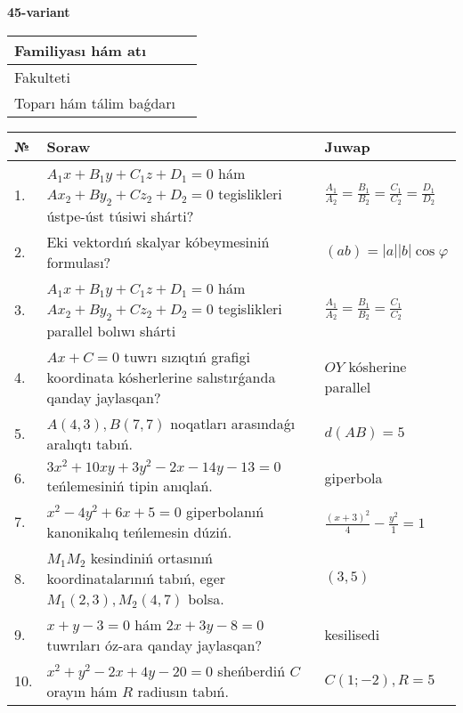 \documentclass{article}
\begin{document}
\egroup

\newpage


\textbf{45-variant}\\

\bgroup
\def\arraystretch{1.6} %

\begin{tabular}{|m{5.7cm}|m{9.5cm}|}
\hline
Familiyası hám atı & \\
\hline
Fakulteti  & \\
\hline
Toparı hám tálim baǵdarı  & \\
\hline
\end{tabular}

\vspace{1cm}

\begin{tabular}{|m{0.7cm}|m{10cm}|m{4cm}|}
\hline
№ & Soraw & Juwap \\
\hline
1. & $A_1x+B_1y+C_1z+D_1=0$ hám $Ax_2+By_2+Cz_2+D_2=0$ tegislikleri ústpe-úst túsiwi shárti? & $\frac{A_1}{A_2}=\frac{B_1}{B_2}=\frac{C_1}{C_2}=\frac{D_1}{D_2}$ \\
\hline
2. & Eki vektordıń skalyar kóbeymesiniń formulası? & $(ab)=|a||b|\cos\varphi$ \\
\hline
3. & $A_1x+B_1y+C_1z+D_1=0$ hám $Ax_2+By_2+Cz_2+D_2=0$ tegislikleri parallel bolıwı shárti & $\frac{A_1}{A_2}=\frac{B_1}{B_2}=\frac{C_1}{C_2}$ \\
\hline
4. & $Ax+C=0$ tuwrı sızıqtıń grafigi koordinata kósherlerine salıstırǵanda qanday jaylasqan? & $OY$ kósherine parallel \\
\hline
5. & $A(4, 3), B(7, 7)$ noqatları arasındaǵı aralıqtı tabıń. & $d(AB)=5$ \\
\hline
6. & $3x^{2}+10xy+3y^{2}-2x-14y-13=0$ teńlemesiniń tipin anıqlań. & giperbola \\
\hline
7. & $x^{2}-4y^{2}+6x+5=0$ giperbolanıń kanonikalıq teńlemesin dúziń. & $\frac{(x+3)^{2}}{4}-\frac{y^{2}}{1}=1$ \\
\hline
8. & $M_{1}M_{2}$ kesindiniń ortasınıń koordinatalarınıń tabıń, eger $M_{1} (2, 3), M_{2} (4, 7)$ bolsa. & $(3,5)$ \\
\hline
9. & $x+y-3=0$ hám $2x+3y-8=0$ tuwrıları óz-ara qanday jaylasqan? & kesilisedi \\
\hline
10. & $x^{2}+y^{2}-2x+4y-20=0$ sheńberdiń $C$ orayın hám $R$ radiusın tabıń. & $C(1;-2), R=5$ \\
\hline
\end{tabular}
\end{document}
